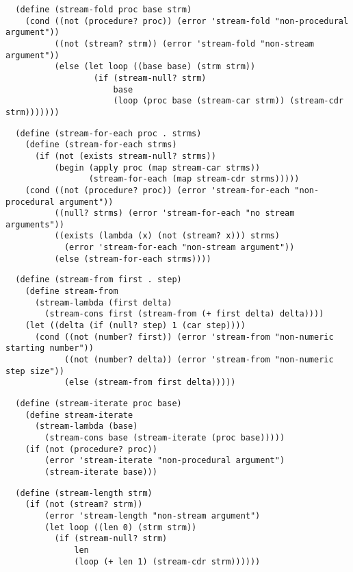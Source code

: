 \begin{verbatim}
  (define (stream-fold proc base strm)
    (cond ((not (procedure? proc)) (error 'stream-fold "non-procedural argument"))
          ((not (stream? strm)) (error 'stream-fold "non-stream argument"))
          (else (let loop ((base base) (strm strm))
                  (if (stream-null? strm)
                      base
                      (loop (proc base (stream-car strm)) (stream-cdr strm)))))))
\end{verbatim}

\begin{verbatim}
  (define (stream-for-each proc . strms)
    (define (stream-for-each strms)
      (if (not (exists stream-null? strms))
          (begin (apply proc (map stream-car strms))
                 (stream-for-each (map stream-cdr strms)))))
    (cond ((not (procedure? proc)) (error 'stream-for-each "non-procedural argument"))
          ((null? strms) (error 'stream-for-each "no stream arguments"))
          ((exists (lambda (x) (not (stream? x))) strms)
            (error 'stream-for-each "non-stream argument"))
          (else (stream-for-each strms))))
\end{verbatim}

\begin{verbatim}
  (define (stream-from first . step)
    (define stream-from
      (stream-lambda (first delta)
        (stream-cons first (stream-from (+ first delta) delta))))
    (let ((delta (if (null? step) 1 (car step))))
      (cond ((not (number? first)) (error 'stream-from "non-numeric starting number"))
            ((not (number? delta)) (error 'stream-from "non-numeric step size"))
            (else (stream-from first delta)))))
\end{verbatim}

\begin{verbatim}
  (define (stream-iterate proc base)
    (define stream-iterate
      (stream-lambda (base)
        (stream-cons base (stream-iterate (proc base)))))
    (if (not (procedure? proc))
        (error 'stream-iterate "non-procedural argument")
        (stream-iterate base)))
\end{verbatim}

\begin{verbatim}
  (define (stream-length strm)
    (if (not (stream? strm))
        (error 'stream-length "non-stream argument")
        (let loop ((len 0) (strm strm))
          (if (stream-null? strm)
              len
              (loop (+ len 1) (stream-cdr strm))))))
\end{verbatim}

